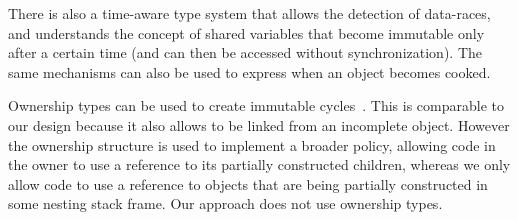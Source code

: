 There is also a time-aware type system \cite{Matsakis:2010:TTS:1869459.1869511}
that allows the detection of data-races, and understands the concept of shared
variables that become immutable only after a certain time
(and can then be accessed without synchronization).  The same mechanisms can also be
used to express when an object becomes cooked.

Ownership types can be used to create immutable cycles~\cite{Zibin:2010:OIG:1869459.1869509}.
This is comparable to
our  design because it also allows  to be linked from an
incomplete object.  However the ownership structure is used to implement a
broader policy, allowing code in the owner to use a reference to its partially
constructed children, whereas we only allow code to use a reference to objects
that are being partially constructed in some nesting stack frame.  Our
approach does not use ownership types.
